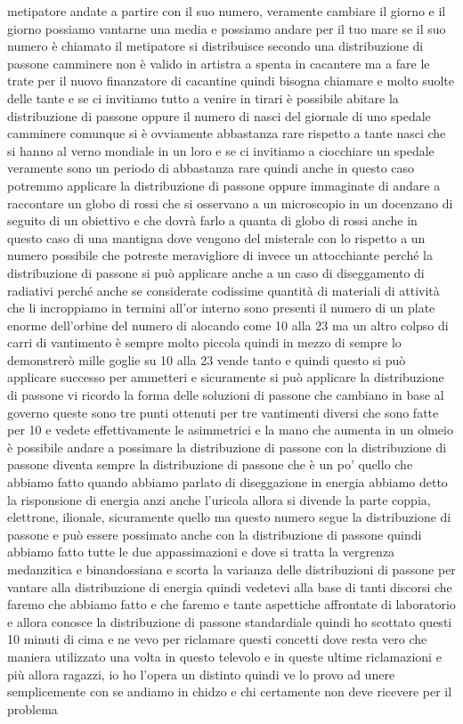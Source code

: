 metipatore andate a partire con il suo numero, veramente cambiare il giorno e il giorno possiamo vantarne una media e possiamo andare per il tuo mare se il suo numero è chiamato il metipatore si distribuisce secondo una distribuzione di passone camminere non è valido in artistra a spenta in cacantere ma a fare le trate per il nuovo finanzatore di cacantine quindi bisogna chiamare e molto suolte delle tante e se ci invitiamo tutto a venire in tirari è possibile abitare la distribuzione di passone oppure il numero di nasci del giornale di uno spedale camminere comunque si è ovviamente abbastanza rare rispetto a tante nasci che si hanno al verno mondiale in un loro e se ci invitiamo a ciocchiare un spedale veramente sono un periodo di abbastanza rare quindi anche in questo caso potremmo applicare la distribuzione di passone oppure immaginate di andare a raccontare un globo di rossi che si osservano a un microscopio in un docenzano di seguito di un obiettivo e che dovrà farlo a quanta di globo di rossi anche in questo caso di una mantigna dove vengono del misterale con lo rispetto a un numero possibile che potreste meravigliore di invece un attocchiante perché la distribuzione di passone si può applicare anche a un caso di diseggamento di radiativi perché anche se considerate codissime quantità di materiali di attività che li incroppiamo in termini all'or interno sono presenti il numero di un plate enorme dell'orbine del numero di alocando come 10 alla 23 ma un altro colpso di carri di vantimento è sempre molto piccola quindi in mezzo di sempre lo demonstrerò mille goglie su 10 alla 23 vende tanto e quindi questo si può applicare successo per ammetteri e sicuramente si può applicare la distribuzione di passone vi ricordo la forma delle soluzioni di passone che cambiano in base al governo queste sono tre punti ottenuti per tre vantimenti diversi che sono fatte per 10 e vedete effettivamente le asimmetrici e la mano che aumenta in un olmeio è possibile andare a possimare la distribuzione di passone con la distribuzione di passone diventa sempre la distribuzione di passone che è un po' quello che abbiamo fatto quando abbiamo parlato di diseggazione in energia abbiamo detto la risponsione di energia anzi anche l'uricola allora si divende la parte coppia, elettrone, ilionale, sicuramente quello ma questo numero segue la distribuzione di passone e può essere possimato anche con la distribuzione di passone quindi abbiamo fatto tutte le due appassimazioni e dove si tratta la vergrenza medanzitica e binandossiana e scorta la varianza delle distribuzioni di passone per vantare alla distribuzione di energia quindi vedetevi alla base di tanti discorsi che faremo che abbiamo fatto e che faremo e tante aspettiche affrontate di laboratorio e allora conosce la distribuzione di passone standardiale quindi ho scottato questi 10 minuti di cima e ne vevo per riclamare questi concetti dove resta vero che maniera utilizzato una volta in questo televolo e in queste ultime riclamazioni e più allora ragazzi, io ho l'opera un distinto quindi ve lo provo ad unere semplicemente con se andiamo in chidzo e chi certamente non deve ricevere per il problema

